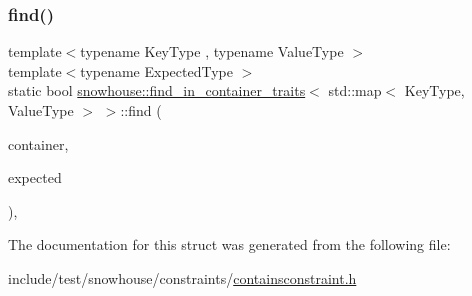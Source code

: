 \subsubsection{\texorpdfstring{find()}{find()}}
{\footnotesize\ttfamily template$<$typename Key\+Type , typename Value\+Type $>$ \\
template$<$typename Expected\+Type $>$ \\
static bool \mbox{\hyperlink{structsnowhouse_1_1find__in__container__traits}{snowhouse\+::find\+\_\+in\+\_\+container\+\_\+traits}}$<$ std\+::map$<$ Key\+Type, Value\+Type $>$ $>$\+::find (\begin{DoxyParamCaption}\item[{const std\+::map$<$ Key\+Type, Value\+Type $>$ \&}]{container,  }\item[{const Expected\+Type \&}]{expected }\end{DoxyParamCaption})\hspace{0.3cm}{\ttfamily [inline]}, {\ttfamily [static]}}



The documentation for this struct was generated from the following file\+:\begin{DoxyCompactItemize}
\item 
include/test/snowhouse/constraints/\mbox{\hyperlink{containsconstraint_8h}{containsconstraint.\+h}}\end{DoxyCompactItemize}

